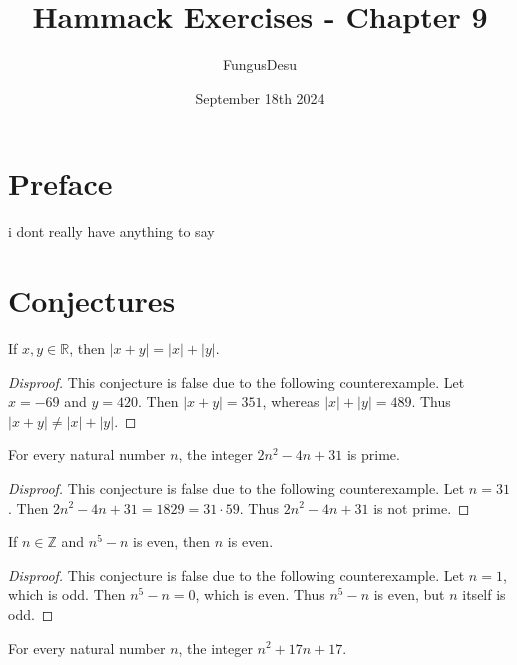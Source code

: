 \documentclass{exam}
\title{Hammack Exercises - Chapter 9}
\author{FungusDesu}
\date{September 18th 2024}
\begin{document}
\maketitle

\section{Preface}
i dont really have anything to say

\section{Conjectures}

\begin{conjecture}{9.1}
    If $x, y\in\mathbb R$, then $\lvert x+y\rvert = \lvert x\rvert+\lvert y\rvert$.
\end{conjecture}

\begin{proof}[Disproof]
    This conjecture is false due to the following counterexample. Let $x=-69$ and $y=420$. Then $\lvert x+y\rvert=351$, whereas $\lvert x\rvert + \lvert y\rvert = 489$. Thus $\lvert x+y\rvert \neq \lvert x\rvert+\lvert y\rvert$.
\end{proof}

\begin{conjecture}{9.2}
    For every natural number $n$, the integer $2n^2-4n+31$ is prime.
\end{conjecture}

\begin{proof}[Disproof]
    This conjecture is false due to the following counterexample. Let $n = 31$. Then $2n^2-4n+31 = 1829 = 31\cdot59$. Thus $2n^2-4n+31$ is not prime.
\end{proof}

\begin{conjecture}{9.3}
    If $n\in\mathbb Z$ and $n^5-n$ is even, then $n$ is even.
\end{conjecture}

\begin{proof}[Disproof]
    This conjecture is false due to the following counterexample. Let $n=1$, which is odd. Then $n^5-n=0$, which is even. Thus $n^5-n$ is even, but $n$ itself is odd.
\end{proof}

\begin{conjecture}{9.4}
    For every natural number $n$, the integer $n^2+17n+17$.
\end{conjecture}
\end{document}

